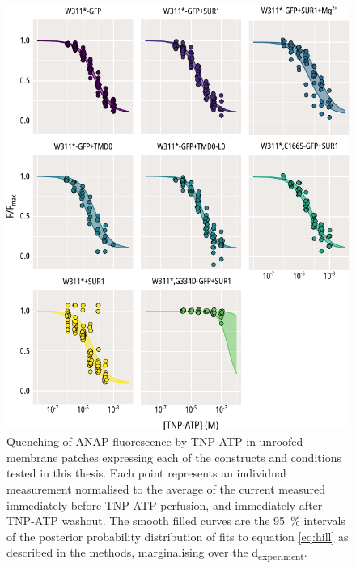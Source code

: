 \begin{figure}[h]
	\centering
	\includegraphics[width=\textwidth]{all_unroofed_fits_1.pdf}
	\caption[Unroofed membrane quenching population hill fits]{
	Quenching of ANAP fluorescence by TNP-ATP in unroofed membrane patches expressing each of the constructs and conditions tested in this thesis.
	Each point represents an individual measurement normalised to the average of the current measured immediately before TNP-ATP perfusion, and immediately after TNP-ATP washout.
	The smooth filled curves are the \SI{95}{\percent} intervals of the posterior probability distribution of fits to equation \ref{eq:hill} as described in the methods, marginalising over the \textgreek{d}\textsubscript{experiment}.
	}
	\label{apxfig:unroofed_1}
\end{figure}

